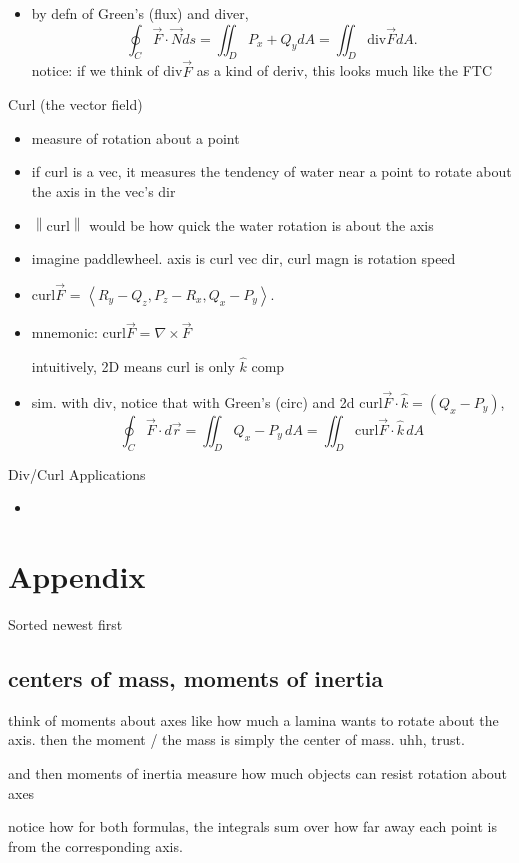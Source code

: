 \documentclass[11pt]{article}
\theoremstyle{definition}
\newcommand{\addsection}[1]{\section*{#1}\addcontentsline{toc}{section}{#1}} %
\newcommand{\col}[1]{\begin{minipage}{\columnwidth}#1\end{minipage}}
\newcommand{\magn}[1]{\left\lVert #1 \right\rVert}
\begin{document}
\begin{multicols}{2}
{\begin{itemize}
      converse is true on simply connected $\vec{F}$.
      \item by defn of Green's (flux) and diver,
      \[\oint_C \vec{F}\cdot\vec{N}ds = \iint_D P_x+Q_ydA=\iint_D \text{div}\vec{F}dA.\]
      notice: if we think of div$\vec{F}$ as a kind of deriv, this looks much like the FTC
    \end{itemize}
  }
  \col{
    Curl (the vector field)
    \begin{itemize}
      \item measure of rotation about a point
      \item if curl is a vec, it measures the tendency of water near a point to rotate about the axis in the vec's dir
      \item $\magn{\text{curl}}$ would be how quick the water rotation is about the axis
      \item imagine paddlewheel. axis is curl vec dir, curl magn is rotation speed
      \item \raggedright curl$\vec{F}$ = $\left<R_y-Q_z,P_z-R_x,Q_x-P_y\right>$.
      \item mnemonic: curl$\vec{F}=\nabla\times\vec{F}$
      
      intuitively, 2D means curl is only $\hat{k}$ comp
      \item sim. with div, notice that with Green's (circ) and 2d curl$\vec{F}\cdot\hat{k} = (Q_x-P_y)$,
      \[\oint_C \vec{F}\cdot d\vec{r} = \iint_D Q_x-P_y \,dA = \iint_D \text{curl}\vec{F}\cdot\hat{k}\,dA\]
    \end{itemize}
    Div/Curl Applications
    \begin{itemize}
      \item 
    \end{itemize}
  }
\end{multicols}

\newpage
\addsection{Appendix} 
Sorted newest first

\subsection*{centers of mass, moments of inertia}
think of moments about axes like how much a lamina wants to rotate about the axis. then the moment / the mass is simply the center of mass. uhh, trust.

and then moments of inertia measure how much objects can resist rotation about axes

notice how for both formulas, the integrals sum over how far away each point is from the corresponding axis.
\end{document}

